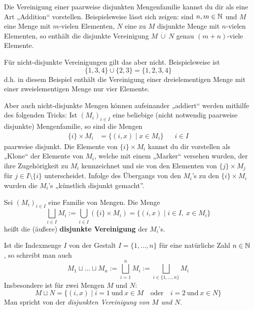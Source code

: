 \begin{bem}
    Die Vereinigung einer paarweise disjunkten Mengenfamilie kannst du dir als eine Art „Addition“ vorstellen. Beispielsweise lässt sich zeigen: sind $n,m\in \mathbb N$ und $M$ eine Menge mit $m$-vielen Elementen, $N$ eine zu $M$ disjunkte Menge mit $n$-vielen Elementen, so enthält die disjunkte Vereinigung $M\ \dot\cup\ N$ genau $(m+n)$-viele Elemente.

    Für nicht-disjunkte Vereinigungen gilt das aber nicht. Beispielsweise ist
        \[\{1,3,4\} \cup \{2,3\}= \{1,2,3,4\} \]
    d.h. in diesem Beispiel enthält die Vereinigung einer dreielementigen Menge mit einer zweielementigen Menge nur vier Elemente.

    Aber auch nicht-disjunkte Mengen können aufeinander „addiert“ werden mithilfe des folgenden Tricks: Ist $(M_i)_{i\in I}$ eine beliebige (nicht notwendig paarweise disjunkte) Mengenfamilie, so sind die Mengen
    \begin{align*}
        \{i\}\times M_i &= \{(i,x) \mid x\in M_i\} && i\in I
    \end{align*}
    paarweise disjunkt. Die Elemente von $\{i\}\times M_i$ kannst du dir vorstellen als „Klone“ der Elemente von $M_i$, welche mit einem „Marker“ versehen wurden, der ihre Zugehörigkeit zu $M_i$ kennzeichnet und sie von den Elementen von $\{j\}\times M_j$ für $j\in I\setminus \{i\}$ unterscheidet. Infolge des Übergangs von den $M_i$'s zu den $\{i\}\times M_i$ wurden die $M_i$'s „künstlich disjunkt gemacht”.
\end{bem}


\begin{de} \label{def:disjunktcup} 
    Sei $(M_i)_{i\in I}$ eine Familie von Mengen. Die Menge
        \[ \bigsqcup_{i\in I} M_i := \bigcup_{i\in I} (\{i\}\times M_i) = \{(i,x) \mid i\in I,\ x\in M_i \}\]
    heißt die (äußere) \textbf{disjunkte Vereinigung} der $M_i$'s.
    
    Ist die Indexmenge $I$ von der Gestalt $I=\{1,\dots , n\}$ für eine natürliche Zahl $n\in \mathbb N$, so schreibt man auch
        \[ M_1\sqcup\ldots\sqcup M_n := \bigsqcup_{i=1}^n M_i := \bigsqcup_{i\in \{1,\dots , n\}} M_i \]
    Insbesondere ist für zwei Mengen $M$ und $N$:
        \[ M\sqcup N = \{ (i,x)\mid i=1\ \text{und}\ x\in M\quad\text{oder}\quad i=2\ \text{und}\ x\in N\} \]
    Man spricht von der \emph{disjunkten Vereinigung von $M$ und $N$}.
\end{de}


